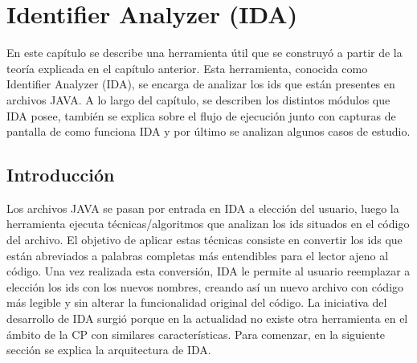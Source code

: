 \documentclass[a4paper,12pt]{report}
\renewcommand{\headrulewidth}{1pt}%
\begin{document}


\chapter{Identifier Analyzer (IDA)}
\fancyhf{}
\pagestyle{fancy}
\lhead[]{\leftmark}
\chead[]{}
\rhead[]{\thepage}
\renewcommand{\headrulewidth}{1pt}

En este capítulo se describe una herramienta útil que se construyó a partir de la teoría explicada en el capítulo anterior. Esta herramienta, conocida como Identifier Analyzer (IDA), se encarga de analizar los ids que están presentes en archivos JAVA. A lo largo del capítulo, se describen los distintos módulos que IDA posee, también se explica sobre el flujo de ejecución junto con capturas de pantalla de como funciona IDA y por último se analizan algunos casos de estudio. 

\section{Introducción}

Los archivos JAVA se pasan por entrada en IDA a elección del usuario, luego la herramienta ejecuta técnicas/algoritmos que analizan los ids situados en el código del archivo. El objetivo de aplicar estas técnicas consiste en convertir los ids que están abreviados a palabras completas más entendibles para el lector ajeno al código. Una vez realizada esta conversión, IDA le permite al usuario reemplazar a elección los ids con los nuevos nombres, creando así un nuevo archivo con código más legible y sin alterar la funcionalidad original del código. La iniciativa del desarrollo de IDA surgió porque en la actualidad no existe otra herramienta en el ámbito de la CP con similares características.
Para comenzar, en la siguiente sección se explica la arquitectura de IDA.
\end{document}
